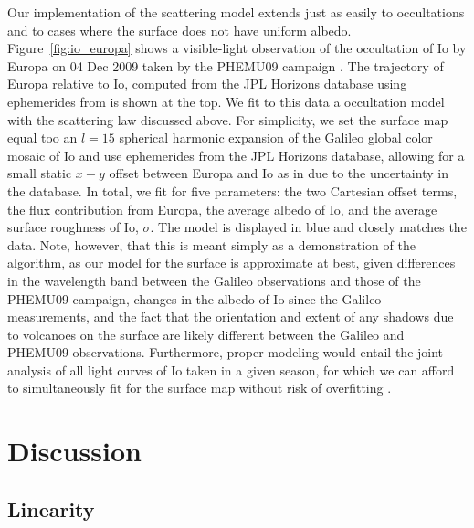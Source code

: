 \documentclass[modern]{aastex62}
\begin{document}
Our implementation of the scattering model extends just as easily
to occultations and to cases where the surface does not have uniform albedo.
Figure~\ref{fig:io_europa} shows a visible-light observation of the
occultation of Io by Europa on 04 Dec 2009 taken by the PHEMU09
campaign \citep{Arlot2014}. The trajectory of Europa relative to Io,
computed from the \href{https://ssd.jpl.nasa.gov/horizons.cgi}{JPL Horizons database}
using ephemerides from \citet{Folkner2014}
is shown at the top. We fit to this data a \starry occultation model
with the scattering law discussed above.
For simplicity, we set the surface map equal too
an $l=15$ spherical harmonic expansion of the Galileo global color mosaic
of Io \citep{Becker2005} and use ephemerides from the JPL Horizons
database, allowing for a small static $x-y$ offset between Europa and Io as
in \citep{Arlot2014} due to the uncertainty in the database. In total,
we fit for five parameters: the two Cartesian offset terms,
the flux contribution from Europa, the average
albedo of Io, and the average surface roughness of Io, $\sigma$. The model
is displayed in blue and closely matches the data.
%
Note, however, that this is meant simply as a demonstration of the \starry
algorithm, as our model for the surface is approximate at best, given
differences in the wavelength band between the Galileo observations and
those of the PHEMU09 campaign, changes in the albedo of Io since the Galileo
measurements, and the fact that the orientation and extent of any shadows
due to volcanoes on the surface are likely different between the Galileo
and PHEMU09 observations. Furthermore,
proper modeling would entail the
joint analysis of all light curves of Io taken in a given season, for which
we can afford to simultaneously fit for the surface map without risk of
overfitting \citep{Bartolic2021}.

\section{Discussion}
\label{sec:discussion}

\subsection{Linearity}
\label{sec:linearity}
\end{document}

